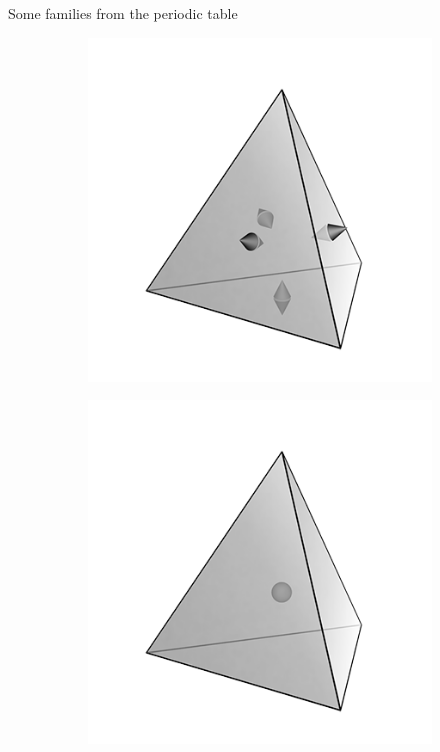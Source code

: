 \documentclass[aspectratio=169]{beamer}
\begin{document}
\begin{frame}{Some families from the periodic table}
\begin{figure}[t]
\begin{subfigure}[t]{0.23\textwidth}
	\end{subfigure}\hfill
	\begin{subfigure}[t]{0.23\textwidth}
		\includegraphics[width=\columnwidth]{N1f1_tetrahedron.png}%
	\end{subfigure}\hfill
	\begin{subfigure}[t]{0.23\textwidth}
		\includegraphics[width=\columnwidth]{dP0_tetrahedron.png}%

\end{subfigure}
\end{figure}
\end{frame}
\end{document}
